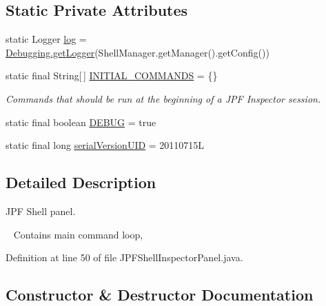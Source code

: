 \subsection*{Static Private Attributes}
\begin{DoxyCompactItemize}
\item 
static Logger \hyperlink{classgov_1_1nasa_1_1jpf_1_1inspector_1_1frontends_1_1jpfshell_1_1_j_p_f_shell_inspector_panel_abb8e338d436091e0021a8731aeb75e67}{log} = \hyperlink{classgov_1_1nasa_1_1jpf_1_1inspector_1_1utils_1_1_debugging_a06cdc92a97816ad85793b034bfd5822a}{Debugging.\+get\+Logger}(Shell\+Manager.\+get\+Manager().get\+Config())
\item 
static final String\mbox{[}$\,$\mbox{]} \hyperlink{classgov_1_1nasa_1_1jpf_1_1inspector_1_1frontends_1_1jpfshell_1_1_j_p_f_shell_inspector_panel_a23cb9ba3b9b1b74057ecca791cb460ac}{I\+N\+I\+T\+I\+A\+L\+\_\+\+C\+O\+M\+M\+A\+N\+DS} = \{\}
\begin{DoxyCompactList}\small\item\em Commands that should be run at the beginning of a J\+PF Inspector session. \end{DoxyCompactList}\item 
static final boolean \hyperlink{classgov_1_1nasa_1_1jpf_1_1inspector_1_1frontends_1_1jpfshell_1_1_j_p_f_shell_inspector_panel_ae20a8cdbf44a0cd5a4003b694c7dfabc}{D\+E\+B\+UG} = true
\item 
static final long \hyperlink{classgov_1_1nasa_1_1jpf_1_1inspector_1_1frontends_1_1jpfshell_1_1_j_p_f_shell_inspector_panel_ac93732cf086af817ef4051ff4e157d15}{serial\+Version\+U\+ID} = 20110715L
\end{DoxyCompactItemize}


\subsection{Detailed Description}
J\+PF Shell panel. 

~\newline
 Contains main command loop, 

Definition at line 50 of file J\+P\+F\+Shell\+Inspector\+Panel.\+java.



\subsection{Constructor \& Destructor Documentation}

